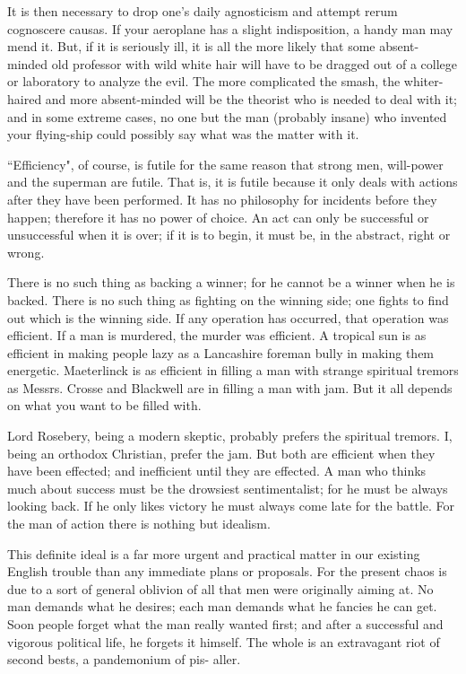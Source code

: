 \documentclass[final,10pt,letterpaper,twocolumn,openany]{book}
\begin{document}
It is then necessary to drop one's daily agnosticism and attempt rerum
cognoscere causas. If your aeroplane has a slight indisposition, a handy
man may mend it. But, if it is seriously ill, it is all the more likely that
some absent-minded old professor with wild white hair will have to be
dragged out of a college or laboratory to analyze the evil. The more
complicated the smash, the whiter-haired and more absent-minded will be
the theorist who is needed to deal with it; and in some extreme cases, no
one but the man (probably insane) who invented your flying-ship could
possibly say what was the matter with it.

``Efficiency", of course, is futile for the same reason that strong men,
will-power and the superman are futile. That is, it is futile because it only
deals with actions after they have been performed. It has no philosophy for
incidents before they happen; therefore it has no power of choice. An act
can only be successful or unsuccessful when it is over; if it is to begin, it
must be, in the abstract, right or wrong. 

There is no such thing as backing
a winner; for he cannot be a winner when he is backed. There is no such
thing as fighting on the winning side; one fights to find out which is the
winning side. If any operation has occurred, that operation was efficient. If
a man is murdered, the murder was efficient. A tropical sun is as efficient
in making people lazy as a Lancashire foreman bully in making them
energetic. Maeterlinck is as efficient in filling a man with strange spiritual
tremors as Messrs. Crosse and Blackwell are in filling a man with jam.
But it all depends on what you want to be filled with. 

Lord Rosebery,
being a modern skeptic, probably prefers the spiritual tremors. I, being an
orthodox Christian, prefer the jam. But both are efficient when they have
been effected; and inefficient until they are effected. A man who thinks
much about success must be the drowsiest sentimentalist; for he must be
always looking back. If he only likes victory he must always come late for
the battle. For the man of action there is nothing but idealism.

This definite ideal is a far more urgent and practical matter in our
existing English trouble than any immediate plans or proposals. For the
present chaos is due to a sort of general oblivion of all that men were
originally aiming at. No man demands what he desires; each man demands
what he fancies he can get. Soon people forget what the man really wanted
first; and after a successful and vigorous political life, he forgets it himself.
The whole is an extravagant riot of second bests, a pandemonium of pis-
aller. 
\end{document}
